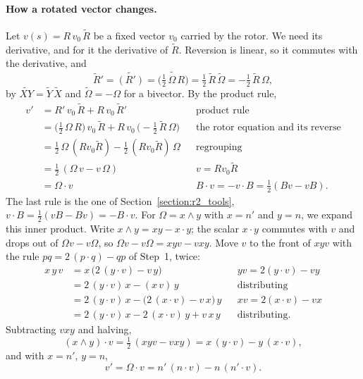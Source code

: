 \paragraph{How a rotated vector changes.} Let $v(s) = R\, v_0\, \widetilde R$ be a fixed vector $v_0$ carried by the rotor. We need its derivative, and for it the derivative of $\widetilde R$. Reversion is linear, so it commutes with the derivative, and
\begin{equation*}
\widetilde R' = \widetilde{(R')} = \widetilde{\big(\tfrac12\,\Omega\, R\big)} = \tfrac12\,\widetilde R\,\widetilde\Omega = -\tfrac12\,\widetilde R\,\Omega ,
\end{equation*}
by $\widetilde{XY} = \widetilde Y\,\widetilde X$ and $\widetilde\Omega = -\Omega$ for a bivector. By the product rule,
\begin{align*}
v' &= R'\, v_0\, \widetilde R + R\, v_0\, \widetilde R' && \text{product rule} \\
&= \big(\tfrac12\,\Omega\, R\big)\, v_0\,\widetilde R + R\, v_0\,\big(-\tfrac12\,\widetilde R\,\Omega\big) && \text{the rotor equation and its reverse} \\
&= \tfrac12\,\Omega\,(R v_0\widetilde R) - \tfrac12\,(R v_0 \widetilde R)\,\Omega && \text{regrouping} \\
&= \tfrac12\,(\Omega\, v - v\,\Omega) && v = R v_0\widetilde R \\
&= \Omega\cdot v && B\cdot v = -v\cdot B = \tfrac12(Bv - vB) .
\end{align*}
The last rule is the one of Section~\ref{section:r2_tools}, $v\cdot B = \frac12(vB - Bv) = -B\cdot v$. For $\Omega = x\wedge y$ with $x = n'$ and $y = n$, we expand this inner product. Write $x\wedge y = xy - x\cdot y$; the scalar $x\cdot y$ commutes with $v$ and drops out of $\Omega v - v\Omega$, so $\Omega v - v\Omega = xyv - vxy$. Move $v$ to the front of $xyv$ with the rule $pq = 2\,(p\cdot q) - qp$ of Step~1, twice:
\begin{align*}
x\, y\, v &= x\,\big(2\,(y\cdot v) - v\, y\big) && y v = 2(y\cdot v) - v y \\
&= 2\,(y\cdot v)\, x - (x\, v)\, y && \text{distributing} \\
&= 2\,(y\cdot v)\, x - \big(2\,(x\cdot v) - v\, x\big)\, y && x v = 2(x\cdot v) - v x \\
&= 2\,(y\cdot v)\, x - 2\,(x\cdot v)\, y + v\, x\, y && \text{distributing.}
\end{align*}
Subtracting $vxy$ and halving,
\begin{equation*}
(x\wedge y)\cdot v = \tfrac12\,(x y v - v x y) = x\,(y\cdot v) - y\,(x\cdot v) ,
\end{equation*}
and with $x = n'$, $y = n$,
\begin{equation*}
v' = \Omega\cdot v = n'\,(n\cdot v) - n\,(n'\cdot v).
\end{equation*}

